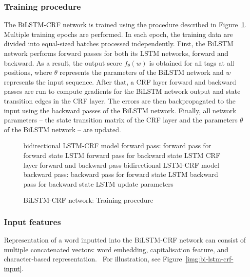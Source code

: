 \subsubsection{Training procedure}
The BiLSTM-CRF network is trained using the procedure described in Figure~\ref{fig:bi-lstm-crf-trainig}. Multiple training epochs are performed. In each epoch, the training data are divided into equal-sized batches processed independently. First, the BiLSTM network performs forward passes for both its LSTM networks, forward and backward. As a result, the output score $f_{\theta}(w)$ is obtained for all tags at all positions, where $\theta$ represents the parameters of the BiLSTM network and $w$ represents the input sequence. After that, a CRF layer forward and backward passes are run to compute
gradients for the BiLSTM network output and state transition
edges in the CRF layer. The errors are then backpropagated to the input using the backward passes of the BiLSTM network. Finally, all network parameters -- the state transition matrix of the CRF layer and the parameters $\theta$ of the BiLSTM network -- are updated.~\cite{BiLSTMCRF}

\begin{figure}[htbp]
    \centering
  \begin{algorithmic}
        \STATE bidirectional LSTM-CRF model forward pass:
            \STATE \quad forward pass for forward state LSTM
            \STATE \quad forward pass for backward state LSTM
        \STATE CRF layer forward and backward pass
        \STATE bidirectional LSTM-CRF model backward pass:
            \STATE \quad backward pass for forward state LSTM
            \STATE \quad backward pass for backward state LSTM
       \STATE update parameters
      \ENDFOR
    \ENDFOR
  \end{algorithmic}
  \caption{BiLSTM-CRF network: Training procedure}\label{fig:bi-lstm-crf-trainig}
\end{figure}

\subsubsection{Input features}
Representation of a word inputted into the BiLSTM-CRF network can consist of multiple concatenated vectors: word embedding, capitalisation feature, and character-based representation.~\cite{BiLSTMCRFHyperparameters} For illustration, see Figure~\ref{img:bi-lstm-crf-input}.

